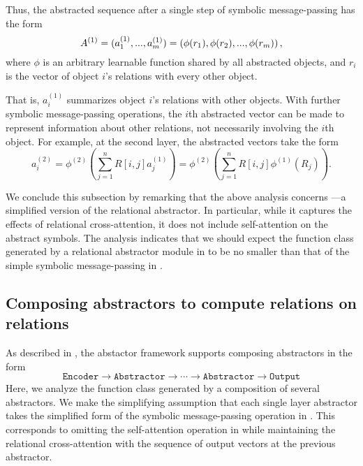 Thus, the abstracted sequence after a single step of symbolic message-passing has the form
\begin{equation}
	\label{eq:abstracted_seq_1_layer_abstractor}
	A^{(1)} = (a_1^{(1)}, ..., a_\m^{(1)}) = \left(\phi(r_1), \phi(r_2), ..., \phi(r_\m)\right),
\end{equation}
where $\phi$ is an arbitrary learnable function shared by all abstracted objects, and $r_i$ is the vector of object $i$'s relations with every other object.

That is, $a_i^{(1)}$ summarizes object $i$'s relations with other objects. With further symbolic message-passing operations, the $i$th abstracted vector can be made to represent information about other relations, not necessarily involving the $i$th object. For example, at the second layer, the abstracted vectors take the form
\begin{equation}
	a_i^{(2)} = \phi^{(2)} \left( \sum_{j=1}^{n} R[i,j] a_j^{(1)} \right) = \phi^{(2)} \left( \sum_{j=1}^{n} R[i,j] \phi^{(1)}(R_j) \right).
\end{equation}

We conclude this subsection by remarking that the above analysis concerns ---a simplified version of the relational  abstractor. In particular, while it captures the effects of relational cross-attention, it does not include self-attention on the abstract symbols. The analysis indicates that we should expect the function class generated by a relational  abstractor module in  to be no smaller than that of the simple symbolic message-passing in .


\subsection{Composing  abstractors to compute relations on relations}
\label{ssec:compsing_abstractors}

As described in , the abstactor framework supports composing  abstractors in the form
\begin{equation*}
	\texttt{Encoder} \to \texttt{Abstractor} \to \cdots \to \texttt{Abstractor} \to \texttt{Output}
\end{equation*}
Here, we analyze the function class generated by a composition of several abstractors. We make the simplifying assumption that each single layer abstractor takes the simplified form of the symbolic message-passing operation in . This corresponds to omitting the self-attention operation in  while maintaining the relational cross-attention with the sequence of output vectors at the previous  abstractor.

